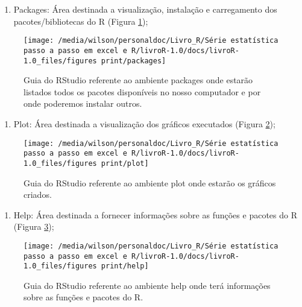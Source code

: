 \documentclass[titlepage, oneside, openany, a4paper]{book}
\providecommand{\tightlist}{%
  \setlength{\itemsep}{0pt}\setlength{\parskip}{0pt}}
\begin{document}
\begin{enumerate}
\def\labelenumi{\arabic{enumi}.}
\setcounter{enumi}{5}
\tightlist
\item
  Packages: Área destinada a visualização, instalação e carregamento dos pacotes/bibliotecas do R (Figura \ref{fig:packages});
\end{enumerate}

\begin{figure}

{\centering \texttt{[image: /media/wilson/personaldoc/Livro\_R/Série estatística passo a passo em excel e R/livroR-1.0/docs/livroR-1.0\_files/figures print/packages]} 

}

\caption{Guia do RStudio referente ao ambiente packages onde estarão listados todos os pacotes disponíveis no nosso computador e por onde poderemos instalar outros.}\label{fig:packages}
\end{figure}

\begin{enumerate}
\def\labelenumi{\arabic{enumi}.}
\setcounter{enumi}{6}
\tightlist
\item
  Plot: Área destinada a visualização dos gráficos executados (Figura \ref{fig:plot});
\end{enumerate}

\begin{figure}

{\centering \texttt{[image: /media/wilson/personaldoc/Livro\_R/Série estatística passo a passo em excel e R/livroR-1.0/docs/livroR-1.0\_files/figures print/plot]} 

}

\caption{Guia do RStudio referente ao ambiente plot onde estarão os gráficos criados.}\label{fig:plot}
\end{figure}

\begin{enumerate}
\def\labelenumi{\arabic{enumi}.}
\setcounter{enumi}{7}
\tightlist
\item
  Help: Área destinada a fornecer informações sobre as funções e pacotes do R (Figura \ref{fig:help});
\end{enumerate}

\begin{figure}

{\centering \texttt{[image: /media/wilson/personaldoc/Livro\_R/Série estatística passo a passo em excel e R/livroR-1.0/docs/livroR-1.0\_files/figures print/help]} 

}

\caption{Guia do RStudio referente ao ambiente help onde terá informações sobre as funções e pacotes do R.}\label{fig:help}
\end{figure}
\end{document}
